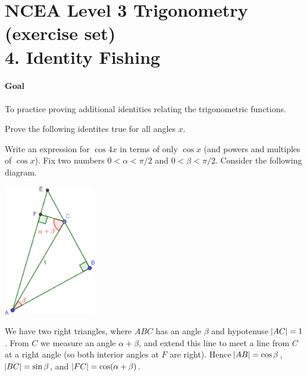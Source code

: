 \documentclass[answers]{exam}
\begin{document}
\section*{NCEA Level 3 Trigonometry (exercise set)\\4. Identity Fishing}
\paragraph{Goal} To practice proving additional identities relating the trigonometric functions.

\begin{questions}
  \question Prove the following identites true for all angles $ x $.
  \question Write an expression for $ \cos 4x $ in terms of only $ \cos x $ (and powers and multiples of $ \cos x $).
  \question Fix two numbers $ 0 < \alpha < \pi/2 $ and $ 0 < \beta < \pi/2 $. Consider the following diagram.
            \begin{center}
              \includegraphics[width=0.3\textwidth]{cosinesum}
            \end{center}
            We have two right triangles, where $ ABC $ has an angle $ \beta $ and hypotenuse $ \abs{AC} = 1 $. From $ C $ we measure an angle $ \alpha + \beta $,
            and extend this line to meet a line from $ C $ at a right angle (so both interior angles at $ F $ are right). Hence $ \abs{AB} = \cos\beta $,
            $ \abs{BC} = \sin \beta $, and $ \abs{FC} = \cos(\alpha + \beta) $.
    \begin{parts}

\end{parts}
\end{questions}
\end{document}
